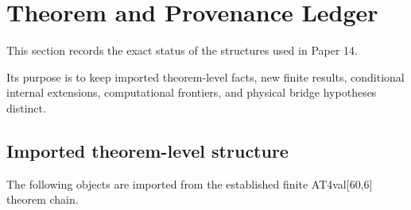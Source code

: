 \section{Theorem and Provenance Ledger}

This section records the exact status of the structures used in Paper
14.

Its purpose is to keep imported theorem-level facts, new finite
results, conditional internal extensions, computational frontiers,
and physical bridge hypotheses distinct.

\subsection{Imported theorem-level structure}

The following objects are imported from the established finite
AT4val[60,6] theorem chain.

